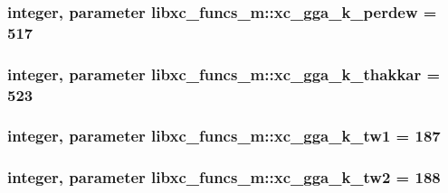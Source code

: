 \hypertarget{classlibxc__funcs__m_ae2575d7cb984fc2fde91e76e83de9f16}{
\subsubsection[{xc\-\_\-gga\-\_\-k\-\_\-perdew}]{\setlength{\rightskip}{0pt plus 5cm}integer, parameter libxc\-\_\-funcs\-\_\-m\-::xc\-\_\-gga\-\_\-k\-\_\-perdew = 517}}\label{classlibxc__funcs__m_ae2575d7cb984fc2fde91e76e83de9f16}
\hypertarget{classlibxc__funcs__m_a475accdc50e4e42b2a8718d63bc464df}{
\subsubsection[{xc\-\_\-gga\-\_\-k\-\_\-thakkar}]{\setlength{\rightskip}{0pt plus 5cm}integer, parameter libxc\-\_\-funcs\-\_\-m\-::xc\-\_\-gga\-\_\-k\-\_\-thakkar = 523}}\label{classlibxc__funcs__m_a475accdc50e4e42b2a8718d63bc464df}
\hypertarget{classlibxc__funcs__m_a762e8a0bffded21d87ee4c507355bf19}{
\subsubsection[{xc\-\_\-gga\-\_\-k\-\_\-tw1}]{\setlength{\rightskip}{0pt plus 5cm}integer, parameter libxc\-\_\-funcs\-\_\-m\-::xc\-\_\-gga\-\_\-k\-\_\-tw1 = 187}}\label{classlibxc__funcs__m_a762e8a0bffded21d87ee4c507355bf19}
\hypertarget{classlibxc__funcs__m_a774d83488fa29f8dca56f41c8bb3f83b}{
\subsubsection[{xc\-\_\-gga\-\_\-k\-\_\-tw2}]{\setlength{\rightskip}{0pt plus 5cm}integer, parameter libxc\-\_\-funcs\-\_\-m\-::xc\-\_\-gga\-\_\-k\-\_\-tw2 = 188}}\label{classlibxc__funcs__m_a774d83488fa29f8dca56f41c8bb3f83b}
